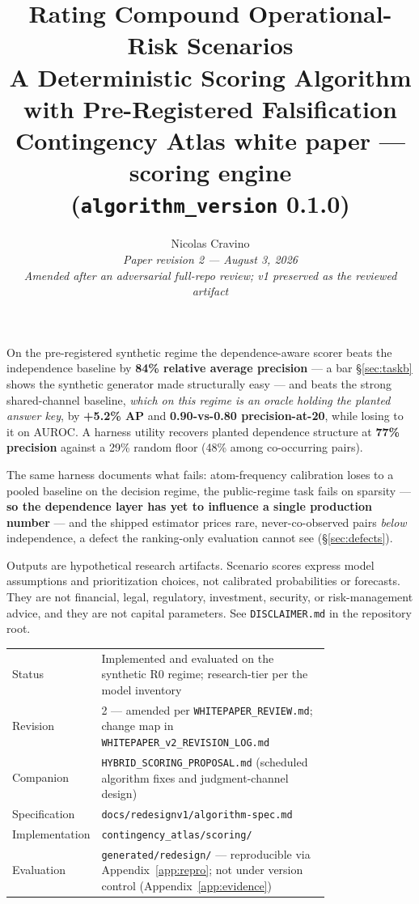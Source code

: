 \documentclass[11pt]{article}
\title{%
  \vspace{-0.5cm}%
  {\color{darkblue}\LARGE\bfseries Rating Compound Operational-Risk Scenarios}\\[6pt]
  {\color{darkred}\Large\bfseries A Deterministic Scoring Algorithm\\ with Pre-Registered Falsification}\\[10pt]
  {\large\normalfont Contingency Atlas white paper --- scoring engine\\
   (\texttt{algorithm\_version} 0.1.0)}
}
\author{%
  Nicolas Cravino\\
  \small\textit{Paper revision 2 --- August 3, 2026}\\[6pt]
  \small\textit{Amended after an adversarial full-repo review; v1 preserved as the reviewed artifact}
}
\date{}
\begin{document}
\maketitle

\begin{tcolorbox}[title=Key Findings --- stated the way a validator would state them]
On the pre-registered synthetic regime the dependence-aware scorer beats the
independence baseline by \textbf{84\% relative average precision} --- a bar
\S\ref{sec:taskb} shows the synthetic generator made structurally easy ---
and beats the strong shared-channel baseline, \emph{which on this regime is
an oracle holding the planted answer key}, by \textbf{+5.2\% AP} and
\textbf{0.90-vs-0.80 precision-at-20}, while losing to it on AUROC. A
harness utility recovers planted dependence structure at \textbf{77\%
precision} against a 29\% random floor (48\% among co-occurring pairs).

The same harness documents what fails: atom-frequency calibration loses to a
pooled baseline on the decision regime, the public-regime task fails on
sparsity --- \textbf{so the dependence layer has yet to influence a single
production number} --- and the shipped estimator prices rare,
never-co-observed pairs \emph{below} independence, a defect the ranking-only
evaluation cannot see (\S\ref{sec:defects}).
\end{tcolorbox}

\begin{tcolorbox}[title=Disclaimer, colframe=darkred, colback=red!4]
Outputs are hypothetical research artifacts. Scenario scores express model
assumptions and prioritization choices, not calibrated probabilities or
forecasts. They are not financial, legal, regulatory, investment, security,
or risk-management advice, and they are not capital parameters. See
\texttt{DISCLAIMER.md} in the repository root.
\end{tcolorbox}

\begin{center}\small
\begin{tabular}{@{}lp{0.78\linewidth}@{}}
\toprule
Status & Implemented and evaluated on the synthetic R0 regime; research-tier per the model inventory \\
Revision & 2 --- amended per \texttt{WHITEPAPER\_REVIEW.md}; change map in \texttt{WHITEPAPER\_v2\_REVISION\_LOG.md} \\
Companion & \texttt{HYBRID\_SCORING\_PROPOSAL.md} (scheduled algorithm fixes and judgment-channel design) \\
Specification & \texttt{docs/redesignv1/algorithm-spec.md} \\
Implementation & \texttt{contingency\_atlas/scoring/} \\
Evaluation & \texttt{generated/redesign/} --- reproducible via Appendix~\ref{app:repro}; not under version control (Appendix~\ref{app:evidence}) \\
\bottomrule
\end{tabular}
\end{center}
\end{document}
